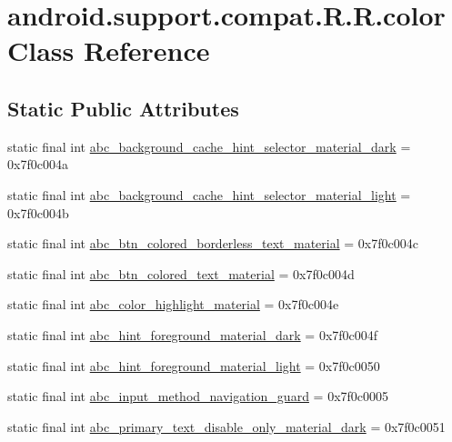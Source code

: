 \hypertarget{classandroid_1_1support_1_1compat_1_1_r_1_1color}{
\section{android.support.compat.R.R.color Class Reference}
\label{classandroid_1_1support_1_1compat_1_1_r_1_1color}
}
\subsection*{Static Public Attributes}
\begin{CompactItemize}
\item 
static final int \hyperlink{classandroid_1_1support_1_1compat_1_1_r_1_1color_8eb7133ef3dd1e76d0dd5942512d1091}{abc\_\-background\_\-cache\_\-hint\_\-selector\_\-material\_\-dark} = 0x7f0c004a
\item 
static final int \hyperlink{classandroid_1_1support_1_1compat_1_1_r_1_1color_d259df753ad2990ea3dc1274242bdc82}{abc\_\-background\_\-cache\_\-hint\_\-selector\_\-material\_\-light} = 0x7f0c004b
\item 
static final int \hyperlink{classandroid_1_1support_1_1compat_1_1_r_1_1color_e27bcb9ab55c243d662d1b07b6b54f58}{abc\_\-btn\_\-colored\_\-borderless\_\-text\_\-material} = 0x7f0c004c
\item 
static final int \hyperlink{classandroid_1_1support_1_1compat_1_1_r_1_1color_8cea2eff8aad289b8f6211dfd9a2e8dd}{abc\_\-btn\_\-colored\_\-text\_\-material} = 0x7f0c004d
\item 
static final int \hyperlink{classandroid_1_1support_1_1compat_1_1_r_1_1color_e6696cdea1ed6533755cc2af5fe9917d}{abc\_\-color\_\-highlight\_\-material} = 0x7f0c004e
\item 
static final int \hyperlink{classandroid_1_1support_1_1compat_1_1_r_1_1color_9fb6d9c0be4bc4de4ed928fe72474d38}{abc\_\-hint\_\-foreground\_\-material\_\-dark} = 0x7f0c004f
\item 
static final int \hyperlink{classandroid_1_1support_1_1compat_1_1_r_1_1color_e86ef04f47eeb7ab87f473a12f8797dd}{abc\_\-hint\_\-foreground\_\-material\_\-light} = 0x7f0c0050
\item 
static final int \hyperlink{classandroid_1_1support_1_1compat_1_1_r_1_1color_e53898a93db10cb13934cd08b2cc4b10}{abc\_\-input\_\-method\_\-navigation\_\-guard} = 0x7f0c0005
\item 
static final int \hyperlink{classandroid_1_1support_1_1compat_1_1_r_1_1color_29182641d801f53d5a700638c74f7963}{abc\_\-primary\_\-text\_\-disable\_\-only\_\-material\_\-dark} = 0x7f0c0051

\end{CompactItemize}
